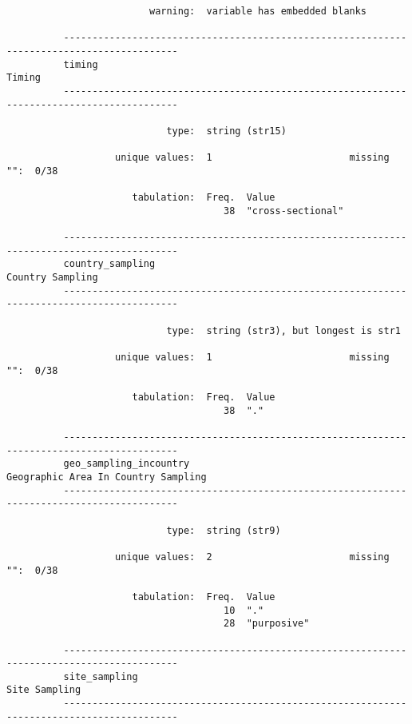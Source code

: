 \documentclass{article}
\begin{document}
\begin{verbatim}
                         warning:  variable has embedded blanks
          
          ------------------------------------------------------------------------------------------
          timing                                                                              Timing
          ------------------------------------------------------------------------------------------
          
                            type:  string (str15)
          
                   unique values:  1                        missing "":  0/38
          
                      tabulation:  Freq.  Value
                                      38  "cross-sectional"
          
          ------------------------------------------------------------------------------------------
          country_sampling                                                          Country Sampling
          ------------------------------------------------------------------------------------------
          
                            type:  string (str3), but longest is str1
          
                   unique values:  1                        missing "":  0/38
          
                      tabulation:  Freq.  Value
                                      38  "."
          
          ------------------------------------------------------------------------------------------
          geo_sampling_incountry                                 Geographic Area In Country Sampling
          ------------------------------------------------------------------------------------------
          
                            type:  string (str9)
          
                   unique values:  2                        missing "":  0/38
          
                      tabulation:  Freq.  Value
                                      10  "."
                                      28  "purposive"
          
          ------------------------------------------------------------------------------------------
          site_sampling                                                                Site Sampling
          ------------------------------------------------------------------------------------------
          

\end{verbatim}
\end{document}
